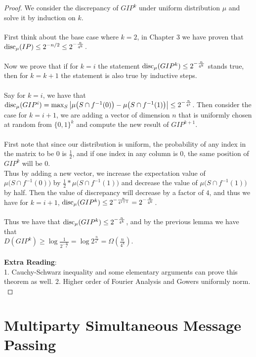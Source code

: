 \begin{proof}
	We consider the discrepancy of $GIP^k$ under uniform distribution $\mu$ and solve it by induction on $k$.\\
	\\
	First think about the base case where $k=2$, in Chapter 3 we have proven that $\mathrm{disc}_\mu(IP) \leq 2^{-n/2} \leq 2^{-\frac{n}{4^k}}$.\\
	\\
	Now we prove that if for $k = i$ the statement $\mathrm{disc}_\mu(GIP^k) \leq 2^{-\frac{n}{4^k}}$ stands true, then for $k = k+1$ the statement is also true by inductive steps.\\
	\\
	Say for $k = i$, we have that $\mathrm{disc}_\mu(GIP^i) = \max_{S} 
	\left| \mu\big( S \cap f^{-1}(0) \big) - \mu\big( S \cap f^{-1}(1)\big) \right| \leq 2^{-\frac{n}{4^i}}$. Then consider the case for $k = i+1$, we are adding a vector of dimension $n$ that is uniformly chosen at random from $\{0,1\}^k$ and compute the new result of $GIP^{k+1}$. \\
	\\
	First note that since our distribution is uniform, the probability of any index in the matrix to be $0$ is $\frac12$, and if one index in any column is $0$, the same position of $GIP^k$ will be $0$.\\
	Thus by adding a new vector, we increase the expectation value of $\mu\big( S \cap f^{-1}(0) \big)$ by $\frac12 * \mu\big( S \cap f^{-1}(1)\big)$ and decrease the value of $\mu\big( S \cap f^{-1}(1)\big)$ by half. Then the value of discrepancy will decrease by a factor of $4$, and thus we have for $k=i+1$, $\mathrm{disc}_\mu(GIP^k) \leq 2^{-\frac{n}{4^{i+1}}} = 2^{-\frac{n}{4^k}}$.\\
	\\
	Thus we have that $\mathrm{disc}_\mu(GIP^k) \leq 2^{-\frac{n}{4^k}}$, and by the previous lemma we have that\\
	$D(GIP^k) \ge  \log \frac{1}{2^{-\frac{n}{4^k}}} = \log {2^{\frac{n}{4^k}}} =\Omega(\frac{n}{4^k}) $.\\\
	\\
	\textbf{Extra Reading}:\\
	1. Cauchy-Schwarz inequality and some elementary arguments can prove this theorem as well.
	2. Higher order of Fourier Analysis and Gowers uniformly norm.\\
\end{proof}




\section{Multiparty Simultaneous Message Passing}

